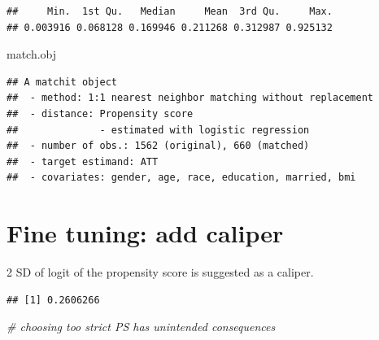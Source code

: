 \documentclass[
]{book}
\newenvironment{Shaded}{\begin{snugshade}}{\end{snugshade}}
\newcommand{\CommentTok}[1]{\textcolor[rgb]{0.56,0.35,0.01}{\textit{#1}}}
\newcommand{\DecValTok}[1]{\textcolor[rgb]{0.00,0.00,0.81}{#1}}
\newcommand{\FunctionTok}[1]{\textcolor[rgb]{0.00,0.00,0.00}{#1}}
\newcommand{\NormalTok}[1]{#1}
\newcommand{\OtherTok}[1]{\textcolor[rgb]{0.56,0.35,0.01}{#1}}
\newcommand{\SpecialCharTok}[1]{\textcolor[rgb]{0.00,0.00,0.00}{#1}}
\begin{document}
\begin{verbatim}
##     Min.  1st Qu.   Median     Mean  3rd Qu.     Max. 
## 0.003916 0.068128 0.169946 0.211268 0.312987 0.925132
\end{verbatim}

\begin{Shaded}
\begin{Highlighting}[]
\NormalTok{match.obj}
\end{Highlighting}
\end{Shaded}

\begin{verbatim}
## A matchit object
##  - method: 1:1 nearest neighbor matching without replacement
##  - distance: Propensity score
##              - estimated with logistic regression
##  - number of obs.: 1562 (original), 660 (matched)
##  - target estimand: ATT
##  - covariates: gender, age, race, education, married, bmi
\end{verbatim}

\hypertarget{fine-tuning-add-caliper}{%
\section{Fine tuning: add caliper}\label{fine-tuning-add-caliper}}

2 SD of logit of the propensity score is suggested as a caliper.

\begin{Shaded}
\end{Shaded}

\begin{verbatim}
## [1] 0.2606266
\end{verbatim}

\begin{Shaded}
\begin{Highlighting}[]
\CommentTok{\# choosing too strict PS has unintended consequences }
\end{Highlighting}
\end{Shaded}
\end{document}

